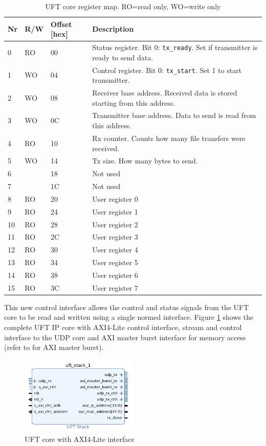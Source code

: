 \begin{table}[tb!]
    \centering
    \begin{tabular}{l l l p{10cm}}
        \toprule
		Nr & R/W & Offset [hex] & Description \\
        \midrule
		0 & RO & 00 & Status register. Bit 0: \texttt{tx\_ready}. Set if transmitter is
		ready to send data. \\
		1 & WO & 04 & Control register. Bit 0: \texttt{tx\_start}. Set 1 to start
		transmitter. \\
		2 & WO & 08 & Receiver base address. Received data is stored starting from this
		address. \\
		3 & WO & 0C & Transmitter base address. Data to send is read from this address.
		\\
		4 & RO & 10 & Rx counter. Counts how many file transfers were received. \\
		5 & WO & 14 & Tx size. How many bytes to send. \\
		6 & & 18 &  Not used\\
		7 & & 1C &  Not used\\
		8 & RO & 20 & User register 0 \\
		9 & RO & 24 & User register 1 \\
		10 & RO & 28 & User register 2 \\
		11 & RO & 2C & User register 3 \\
		12 & RO & 30 & User register 4 \\
		13 & RO & 34 & User register 5 \\
		14 & RO & 38 & User register 6 \\
		15 & RO & 3C & User register 7 \\
        \bottomrule
    \end{tabular}
    \caption{UFT core register map. RO=read only, WO=write only}
    \label{tab:uftaxiregmap}
\end{table}

This new control interface allows the control and status signals from the UFT
core to be read and written using a single normed interface. Figure 
\ref{fig:uftcoreaxilite} shows the complete UFT IP core with AXI4-Lite control
interface, stream and control interface to the UDP core and AXI master burst
interface for memory access (refer to \cite{p5report} for AXI master burst).

\begin{figure}[b!]
    \centering
    \includegraphics[width=0.5\textwidth] {images/dataflow/uftcoreaxilite.png}
    \caption{UFT core with AXI4-Lite interface}
    \label{fig:uftcoreaxilite}
\end{figure}

